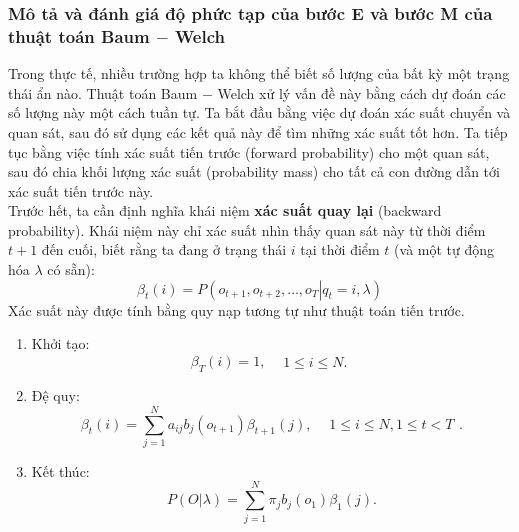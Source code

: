 \subsubsection{Mô tả và đánh giá độ phức tạp của bước E và bước M của thuật toán Baum $-$ Welch}
Trong thực tế, nhiều trường hợp ta không thể biết số lượng của bất kỳ một trạng thái ẩn nào. Thuật toán Baum $-$ Welch xử lý vấn đề này bằng cách dự đoán các số lượng này một cách tuần tự. Ta bắt đầu bằng việc dự đoán xác suất chuyển và quan sát, sau đó sử dụng các kết quả này để tìm những xác suất tốt hơn. Ta tiếp tục bằng việc tính xác suất tiến trước (forward probability) cho một quan sát, sau đó chia khối lượng xác suất (probability mass) cho tất cả con đường dẫn tới xác suất tiến trước này.\\
Trước hết, ta cần định nghĩa khái niệm \textbf{xác suất quay lại} (backward probability). Khái niệm này chỉ xác suất nhìn thấy quan sát này từ thời điểm $t + 1$ đến cuối, biết rằng ta đang ở trạng thái $i$ tại thời điểm $t$ (và một tự động hóa $\lambda$ có sẵn):
\begin{equation}
{\beta _t}\left( i \right) = P\left( {\left. {{o_{t + 1}},{o_{t + 2}}, \ldots ,{o_T}} \right|{q_t} = i,\lambda } \right)
\label{form3}
\end{equation}
Xác suất này được tính bằng quy nạp tương tự như thuật toán tiến trước.
\begin{enumerate}
\item Khởi tạo:
	$${\beta _T}\left( i \right) = 1,\begin{array}{*{20}{c}}
  {}&{1 \leqslant i \leqslant N.} 
\end{array}$$
\item Đệ quy:
$${\beta _t}\left( i \right) = \sum\limits_{j = 1}^N {{a_{ij}}{b_j}\left( {{o_{t + 1}}} \right){\beta _{t + 1}}\left( j \right),} \begin{array}{*{20}{c}}
  {}&{1 \leqslant i \leqslant N,1 \leqslant t < T} 
\end{array}.$$
\item Kết thúc:
$$P\left( {\left. O \right|\lambda } \right) = \sum\limits_{j = 1}^N {{\pi _j}{b_j}\left( {{o_1}} \right){\beta _1}\left( j \right)} .$$
\end{enumerate}


